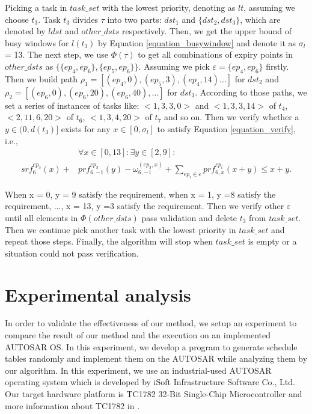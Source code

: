 \documentclass[sigconf]{acmart}
\begin{document}
Picking a task in $task\_set$ with the lowest priority, denoting as $lt$, assuming we choose $t_3$. Task $t_3$ divides $\tau$ into two parts: $dst_1$ and $\{dst_2,dst_3\}$, which are denoted by $ldst$ and $other\_dsts$ respectively. Then, we get the upper bound of busy windows for $l(t_3)$ by Equation \ref{equation_busywindow} and denote it as $\sigma_l$ = 13. The next step, we use $\Phi(\tau)$ to get all combinations of expiry points in $other\_dsts$ as $\{\{ep_4,ep_6\},\{ep_5,ep_6\}\}$. Assuming we pick $\varepsilon=\{ep_4,ep_6\}$ firstly. Then we build path $\rho_1=[(ep_4,0),(ep_5,3),(ep_4,14)\dots]$ for $dst_2$ and $\rho_2=[(ep_6,0),(ep_6,20),(ep_6,40),\dots]$ for $dst_3$. According to those paths, we set a series of instances of tasks like: $<1,3,3,0>$ and $<1,3,3,14>$ of $t_4$, $<2,11,6,20>$ of $t_6$, $<1,3,4,20>$ of $t_7$ and so on. Then we verify whether a $y\in(0,d(t_3)]$ exists for any $x\in[0,\sigma_l]$ to satisfy Equation \ref{equation_verify}, i.e.,
\[\begin{split}
&\forall x\in[0,13]:\exists y\in[2,9]:\\
srf^{ep_3}_6(x)+&prf^{ep_3}_{6,-1}(y)-\omega^{(ep_3,x)}_{6,-1}+\sum\limits_{ep_i\in \varepsilon}prf^{ep_i}_{6,x}(x+y)\leq x+y.
\end{split}\]


When x = 0, y = 9 satisfy the requirement, when x = 1, y =8 satisfy the requirement, ..., x = 13, y =3 satisfy the requirement. Then we verify other $\varepsilon$ until all elements in $\Phi(other\_dsts)$ pass validation and delete $t_3$ from $task\_set$. Then we continue pick another task with the lowest priority in $task\_set$ and repeat those steps. Finally, the algorithm will stop when $task\_set$ is empty or a situation could not pass verification.


\section{Experimental analysis}
In order to validate the effectiveness of our method, we setup an experiment to compare the result of our method and the execution on an implemented AUTOSAR OS. In this experiment, we develop a program to generate schedule tables randomly and implement them on the AUTOSAR while analyzing them by our algorithm. In this experiment, we use an industrial-used AUTOSAR operating system which is developed by iSoft Infrastructure Software Co., Ltd. Our target hardware platform is TC1782 32-Bit Single-Chip Microcontroller and more information about TC1782 in \cite{infineon.org}. 
\end{document}
